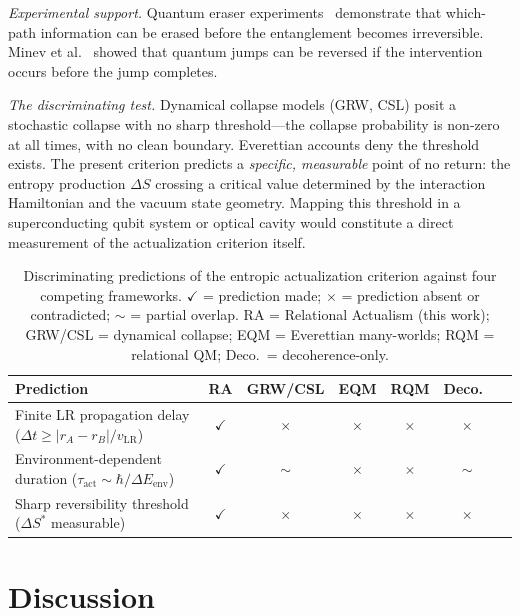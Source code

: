 \documentclass[11pt,twocolumn]{article}
\begin{document}
\emph{Experimental support.}
Quantum eraser experiments~\cite{ScullyDruhl1982} demonstrate
that which-path information can be erased before the entanglement
becomes irreversible.
Minev et al.~\cite{Minev2019} showed that quantum jumps can be
reversed if the intervention occurs before the jump completes.

\emph{The discriminating test.}
Dynamical collapse models (GRW, CSL) posit a stochastic
collapse with no sharp threshold---the collapse probability
is non-zero at all times, with no clean boundary.
Everettian accounts deny the threshold exists.
The present criterion predicts a \emph{specific, measurable} point
of no return: the entropy production $\Delta S$ crossing a critical
value determined by the interaction Hamiltonian and the vacuum
state geometry.
Mapping this threshold in a superconducting qubit system or
optical cavity would constitute a direct measurement of the
actualization criterion itself.

\begin{table}[t]
\centering
\caption{Discriminating predictions of the entropic actualization
  criterion against four competing frameworks.
  $\checkmark$ = prediction made; $\times$ = prediction absent or
  contradicted; $\sim$ = partial overlap.
  RA = Relational Actualism (this work); GRW/CSL = dynamical collapse;
  EQM = Everettian many-worlds; RQM = relational QM; Deco.\ = decoherence-only.}
\label{tab:predictions}
\small
\begin{tabular}{lcccccc}
\toprule
Prediction & RA & GRW/CSL & EQM & RQM & Deco.\ \\
\midrule
Finite LR propagation delay ($\Delta t \geq |r_A-r_B|/v_\mathrm{LR}$) & $\checkmark$ & $\times$ & $\times$ & $\times$ & $\times$ \\
Environment-dependent duration ($\tau_\mathrm{act} \sim \hbar/\Delta E_\mathrm{env}$) & $\checkmark$ & $\sim$ & $\times$ & $\times$ & $\sim$ \\
Sharp reversibility threshold ($\Delta S^*$ measurable) & $\checkmark$ & $\times$ & $\times$ & $\times$ & $\times$ \\
\bottomrule
\end{tabular}
\end{table}

\section{Discussion}
\label{sec:discussion}
\end{document}
